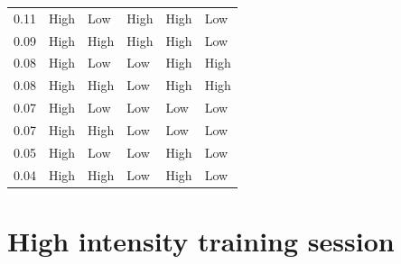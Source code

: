 \documentclass[
  english,
  man,floatsintext]{apa6}
\begin{document}
\begin{table}[H]
\begin{center}
\begin{threeparttable}
\begin{tabular}{llllll}
0.11 & High & Low & High & High & Low\\
0.09 & High & High & High & High & Low\\
0.08 & High & Low & Low & High & High\\
0.08 & High & High & Low & High & High\\
0.07 & High & Low & Low & Low & Low\\
0.07 & High & High & Low & Low & Low\\
0.05 & High & Low & Low & High & Low\\
0.04 & High & High & Low & High & Low\\
\bottomrule
\end{tabular}

\end{threeparttable}
\end{center}

\end{table}

\hypertarget{high-intensity-training-session}{%
\section{High intensity training session}\label{high-intensity-training-session}}

\end{document}

